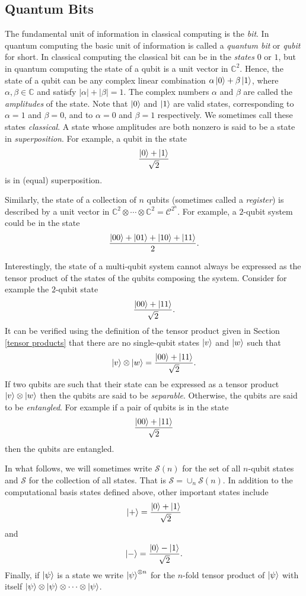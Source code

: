 \documentclass[12pt]{dalthesis}
\begin{document}
\subsection{Quantum Bits}
The fundamental unit of information in classical computing is the \emph{bit}. In quantum computing the basic unit of information is called a \emph{quantum bit} or \emph{qubit} for short. In classical computing the classical bit can be in the \emph{states} $0$ or $1$, but in quantum computing the state of a qubit is a unit vector in $\mathbb{C}^2$. Hence, the state of a qubit can be any complex linear combination $\alpha \ket{0} + \beta \ket{1}$, where $\alpha , \beta \in \mathbb{C}$ and satisfy $|\alpha | + |\beta | = 1$. The complex numbers $\alpha$ and $\beta$ are called the \emph{amplitudes} of the state. Note that $\ket{0}$ and $\ket{1}$ are valid states, corresponding to $\alpha = 1$ and $\beta = 0$, and to $\alpha = 0$ and $\beta = 1$ respectively. We sometimes call these states \emph{classical}. A state whose amplitudes are both nonzero is said to be a state in \emph{superposition}. For example, a qubit in the state \[ \frac{\ket{0} + \ket{1}}{\sqrt{2}} \] is in (equal) superposition.

Similarly, the state of a collection of $n$ qubits (sometimes called a \emph{register}) is described by a unit vector in $\mathbb{C}^2 \otimes \cdots \otimes \mathbb{C}^2 = \mathcal{C}^{2^n}$. For example, a $2$-qubit system could be in the state \[ \frac{\ket{00} + \ket{01} + \ket{10} + \ket{11}}{2}. \]

Interestingly, the state of a multi-qubit system cannot always be expressed as the tensor product of the states of the qubits composing the system. Consider for example the $2$-qubit state \[ \frac{\ket{00} + \ket{11}}{\sqrt{2}}. \]
It can be verified using the definition of the tensor product given in Section \ref{tensor products} that there are no single-qubit states $\ket{v}$ and $\ket{w}$ such that \[ \ket{v} \otimes \ket{w} = \frac{\ket{00} + \ket{11}}{\sqrt{2}}. \]
If two qubits are such that their state can be expressed as a tensor product $\ket{v} \otimes \ket{w}$ then the qubits are said to be \emph{separable}. Otherwise, the qubits are said to be \emph{entangled}.
For example if a pair of qubits is in the state \[ \frac{\ket{00} + \ket{11}}{\sqrt{2}} \] then the qubits are entangled.

In what follows, we will sometimes write $\mathcal{S}(n)$ for the set of all $n$-qubit states and $\mathcal{S}$ for the collection of all states. That is $\mathcal{S} = \cup_n \mathcal{S}(n)$. In addition to the computational basis states defined above, other important states include \[ \ket{+} = \frac{\ket{0} + \ket{1}}{\sqrt{2}} \] and \[ \ket{-} = \frac{\ket{0} - \ket{1}}{\sqrt{2}}. \]
Finally, if $\ket{\psi}$ is a state we write $\ket{\psi}^{\otimes n}$ for the $n$-fold tensor product of $\ket{\psi}$ with itself $\ket{\psi} \otimes \ket{\psi} \otimes \cdots \otimes \ket{\psi}$.
\end{document}
